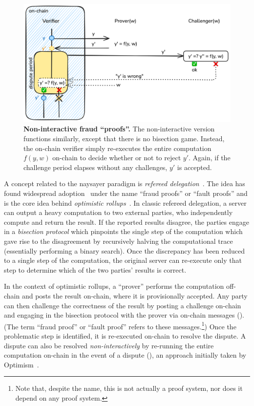  \begin{figure}[tbh]
    \includegraphics[width=\textwidth]{naysayer/figs/fraud-NI.png}
    \caption{\textbf{Non-interactive fraud ``proofs''.} The non-interactive version functions similarly, except that there is no bisection game. Instead, the on-chain verifier simply re-executes the entire computation $f(y, w)$ on-chain to decide whether or not to reject $y'$. Again, if the challenge period elapses without any challenges, $y'$ is accepted.}
    \label{fig:fraud-NI}
 \end{figure}

A concept related to the naysayer paradigm is \emph{refereed delegation}~\cite{STOC:FeiKil97}. The idea has found widespread adoption~\cite{ARXIV:TeuRei19,USENIX:KGCWF18} under the name ``fraud proofs'' or ``fault proofs'' and is the core idea behind \emph{optimistic rollups}~\cite{ethereum_optimistic,arbitrum_nitro,optimism_rollup}. In classic refereed delegation, a server can output a heavy computation to two external parties, who independently compute and return the result. If the reported results disagree, the parties engage in a \emph{bisection protocol} which pinpoints the single step of the computation which gave rise to the disagreement by recursively halving the computational trace (essentially performing a binary search). Once the discrepancy has been reduced to a single step of the computation, the original server can re-execute only that step to determine which of the two parties' results is correct. 

In the context of optimistic rollups, a ``prover'' performs the computation off-chain and posts the result on-chain, where it is provisionally accepted. Any party can then challenge the correctness of the result by posting a challenge on-chain and engaging in the bisection protocol with the prover via on-chain messages (). (The term ``fraud proof'' or ``fault proof'' refers to these messages.\footnote{Note that, despite the name, this is not actually a proof system, nor does it depend on any proof system.}) Once the problematic step is identified, it is re-executed on-chain to resolve the dispute. A dispute can also be resolved \emph{non-interactively} by re-running the entire computation on-chain in the event of a dispute (), an approach initially taken by Optimism~\cite{optimism_v1,fraudproofs_medium}.

